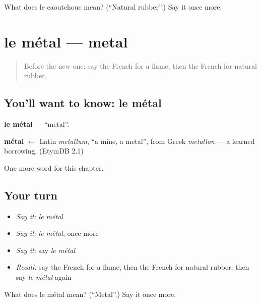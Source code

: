 \begin{tcolorbox}[breakable,colback=teal!4,colframe=teal!35!black,title={Before you move on}]
What does le caoutchouc mean? (\textquotedblleft{}Natural rubber\textquotedblright{}.) Say it once more.
\end{tcolorbox}
\section[le métal]{le métal — metal}

\label{lesson:FR-C202-metal}



\begin{quote}
Before the new one: say the French for a flame, then the French for natural rubber.
\end{quote}

\subsection*{You'll want to know: le métal}
\textbf{le métal} — \textquotedblleft{}metal\textquotedblright{}.

\begin{cousinweb}
\textbf{métal} $\leftarrow$ Latin \emph{metallum}, \textquotedblleft{}a mine, a metal\textquotedblright{}, from Greek \emph{metallon} — a learned borrowing. (EtymDB 2.1)
\end{cousinweb}

\begin{grammarlens}[title={What you've built}]
One more word for this chapter.
\end{grammarlens}

\subsection*{Your turn}
\begin{itemize}
\raggedright
  \item \emph{Say it:} \emph{le métal}
  \item \emph{Say it:} \emph{le métal}, once more
  \item \emph{Say it:} say \emph{le métal}
  \item \emph{Recall:} say the French for a flame, then the French for natural rubber, then say \emph{le métal} again
\end{itemize}

\begin{tcolorbox}[breakable,colback=teal!4,colframe=teal!35!black,title={Before you move on}]
What does le métal mean? (\textquotedblleft{}Metal\textquotedblright{}.) Say it once more.
\end{tcolorbox}
